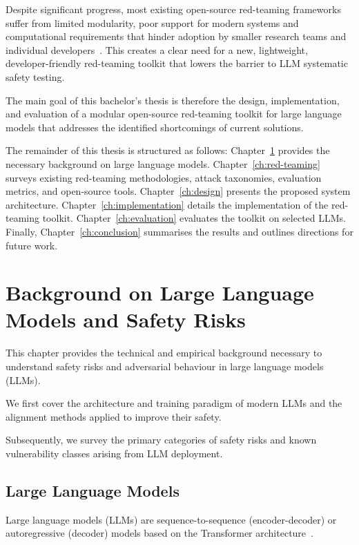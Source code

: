 Despite significant progress, most existing open-source red-teaming frameworks suffer from limited modularity, poor support for modern systems and computational requirements that hinder adoption by smaller research teams and individual developers~\cite{purpura2025building, schoepf2025madmax, belaire2025automatic, munoz2024pyrit}.
This creates a clear need for a new, lightweight, developer-friendly red-teaming toolkit that lowers the barrier to LLM systematic safety testing.

The main goal of this bachelor's thesis is therefore the design, implementation, and evaluation of a modular open-source red-teaming toolkit for large language models that addresses the identified shortcomings of current solutions.

The remainder of this thesis is structured as follows:
Chapter~\ref{ch:background-and-safety} provides the necessary background on large language models.
Chapter~\ref{ch:red-teaming} surveys existing red-teaming methodologies, attack taxonomies, evaluation metrics, and open-source tools.
Chapter~\ref{ch:design} presents the proposed system architecture.
Chapter~\ref{ch:implementation} details the implementation of the red-teaming toolkit.
Chapter~\ref{ch:evaluation} evaluates the toolkit on selected LLMs.
Finally, Chapter~\ref{ch:conclusion} summarises the results and outlines directions for future work.

\chapter{Background on Large Language Models and Safety Risks}\label{ch:background-and-safety}

This chapter provides the technical and empirical background necessary to understand safety risks and adversarial behaviour in large language models (LLMs).

We first cover the architecture and training paradigm of modern LLMs and the alignment methods applied to improve their safety.

Subsequently, we survey the primary categories of safety risks and known vulnerability classes arising from LLM deployment.

\section{Large Language Models}\label{sec:llms}

Large language models (LLMs) are sequence-to-sequence (encoder-decoder) or autoregressive (decoder) models based on the Transformer architecture~\cite{vaswani2017attention}.

